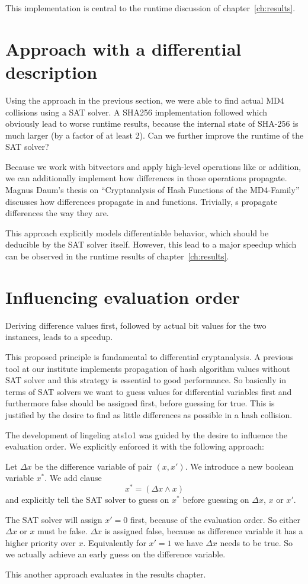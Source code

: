 This implementation is central to the runtime discussion of chapter~\ref{ch:results}.

\section{Approach with a differential description}
\label{sec:enc-diff-desc}
%
Using the approach in the previous section, we were able to find actual MD4 collisions
using a SAT solver. A SHA256 implementation followed which obviously lead to worse
runtime results, because the internal state of SHA-256 is much larger (by a factor
of at least 2). Can we further improve the runtime of the SAT solver?

Because we work with bitvectors and apply high-level operations like  or addition,
we can additionally implement how differences in those operations propagate.
Magnus Daum's thesis on \enquote{Cryptanalysis of Hash Functions of the
MD4-Family}~\cite[Table 4.4]{daum} discusses how differences propagate in  and
 functions. Trivially, s propagate differences the way they are.

This approach explicitly models differentiable behavior, which should be deducible
by the SAT solver itself. However, this lead to a major speedup which can be observed
in the runtime results of chapter~\ref{ch:results}.

\section{Influencing evaluation order}
\label{sec:enc-order}
%
\begin{prop}
  Deriving difference values first, followed by actual bit values for the two instances,
  leads to a speedup.
\end{prop}

This proposed principle is fundamental to differential cryptanalysis. A previous tool
at our institute implements propagation of hash algorithm values without SAT solver
and this strategy is essential to good performance. So basically in terms of SAT solvers
we want to guess values for differential variables first and furthermore false should
be assigned first, before guessing for true. This is justified by the desire to find as
little differences as possible in a hash collision.

The development of lingeling ats1o1 was guided by the desire to influence the evaluation
order. We explicitly enforced it with the following approach:

Let $\Delta x$ be the difference variable of pair $(x, x')$. We introduce a new boolean
variable $x^*$. We add clause
\[ x^* = (\Delta x \land x) \]
and explicitly tell the SAT solver to guess on $x^*$ before guessing on $\Delta x$, $x$ or $x'$.

The SAT solver will assign $x'=0$ first, because of the evaluation order. So either $\Delta x$
or $x$ must be false. $\Delta x$ is assigned false, because as difference variable it has a higher
priority over $x$. Equivalently for $x'=1$ we have $\Delta x$ needs to be true. So we actually
achieve an early guess on the difference variable.

This another approach evaluates in the results chapter.

